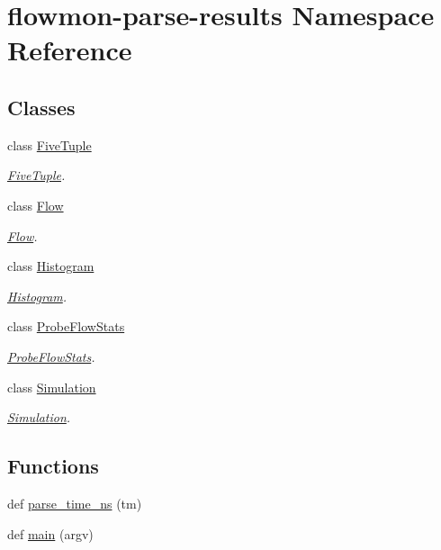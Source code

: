 \hypertarget{namespaceflowmon-parse-results}{}\section{flowmon-\/parse-\/results Namespace Reference}
\label{namespaceflowmon-parse-results}
\subsection*{Classes}
\begin{DoxyCompactItemize}
\item 
class \hyperlink{classflowmon-parse-results_1_1FiveTuple}{Five\+Tuple}
\begin{DoxyCompactList}\small\item\em \hyperlink{classflowmon-parse-results_1_1FiveTuple}{Five\+Tuple}. \end{DoxyCompactList}\item 
class \hyperlink{classflowmon-parse-results_1_1Flow}{Flow}
\begin{DoxyCompactList}\small\item\em \hyperlink{classflowmon-parse-results_1_1Flow}{Flow}. \end{DoxyCompactList}\item 
class \hyperlink{classflowmon-parse-results_1_1Histogram}{Histogram}
\begin{DoxyCompactList}\small\item\em \hyperlink{classflowmon-parse-results_1_1Histogram}{Histogram}. \end{DoxyCompactList}\item 
class \hyperlink{classflowmon-parse-results_1_1ProbeFlowStats}{Probe\+Flow\+Stats}
\begin{DoxyCompactList}\small\item\em \hyperlink{classflowmon-parse-results_1_1ProbeFlowStats}{Probe\+Flow\+Stats}. \end{DoxyCompactList}\item 
class \hyperlink{classflowmon-parse-results_1_1Simulation}{Simulation}
\begin{DoxyCompactList}\small\item\em \hyperlink{classflowmon-parse-results_1_1Simulation}{Simulation}. \end{DoxyCompactList}\end{DoxyCompactItemize}
\subsection*{Functions}
\begin{DoxyCompactItemize}
\item 
def \hyperlink{namespaceflowmon-parse-results_a5612b6aed0ce819ee4f6fd3dbe251622}{parse\+\_\+time\+\_\+ns} (tm)
\item 
def \hyperlink{namespaceflowmon-parse-results_a5d1c01dbc9b4217383d9b577f790496a}{main} (argv)
\end{DoxyCompactItemize}


